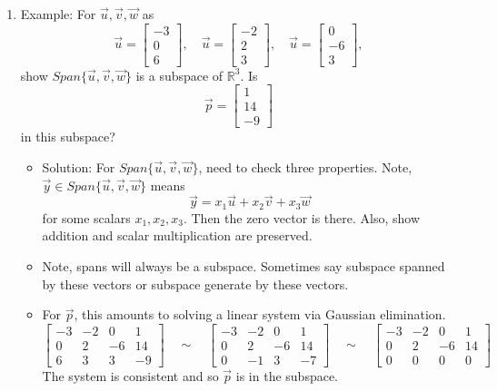 \documentclass{article}
\begin{document}
\begin{enumerate}
\begin{enumerate}
\item Example: For $\vec{u}, \vec{v}, \vec{w}$ as
\[
\vec{u} = \left[
\begin{array}{c}
-3 \\ 0 \\ 6
\end{array}
\right], \quad
\vec{u} = \left[
\begin{array}{c}
-2 \\ 2 \\ 3
\end{array}
\right], \quad
\vec{u} = \left[
\begin{array}{c}
0 \\ -6 \\ 3
\end{array}
\right],
\]
show $Span\{\vec{u},\vec{v},\vec{w}\}$ is a subspace of $\mathbb{R}^3$. Is 
\[
\vec{p} = \left[
\begin{array}{c}
1 \\ 14 \\ -9
\end{array}
\right]
\]
in this subspace?
\begin{itemize}
\item Solution: For $Span\{\vec{u},\vec{v}, \vec{w}\}$, need to check three properties. Note, $\vec{y} \in Span\{\vec{u},\vec{v}, \vec{w}\}$ means
\[
\vec{y} = x_1\vec{u}+x_2\vec{v}+x_3\vec{w}
\]
for some scalars $x_1,x_2,x_3$. Then the zero vector is there. Also, show addition and scalar multiplication are preserved. 
\item Note, spans will always be a subspace. Sometimes say subspace spanned by these vectors or subspace generate by these vectors.
\item For $\vec{p}$, this amounts to solving a linear system via Gaussian elimination.
\[
\left[
\begin{array}{ccc|c}
-3 & -2 & 0 & 1 \\
0 & 2 & -6 & 14\\
6 & 3 & 3 & -9
\end{array}
\right] \quad \sim \quad
\left[
\begin{array}{ccc|c}
-3 & -2 & 0 & 1 \\
0 & 2 & -6 & 14\\
0 & -1 & 3 & -7
\end{array} \right] \quad \sim \quad
\left[
\begin{array}{ccc|c}
-3 & -2 & 0 & 1 \\
0 & 2 & -6 & 14\\
0 & 0 & 0 & 0
\end{array}
\right]
\]
The system is consistent and so $\vec{p}$ is in the subspace.
\end{itemize}


\end{enumerate}
\end{enumerate}
\end{document}
